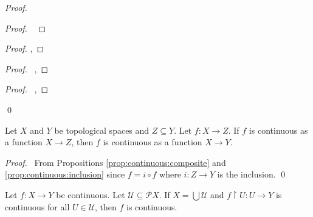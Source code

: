 \begin{proof}
  \pf
  \begin{proof}
    \pf\ 
  \end{proof}
  \begin{proof}
    \pf {}, 
  \end{proof}
  \begin{proof}
    \pf\ , 
  \end{proof}
  \begin{proof}
    \pf\ , 
  \end{proof}
  \qed
\end{proof}

\begin{prop}
  \label{prop:continuous:expand_domain}
  Let $X$ and $Y$ be topological spaces and $Z \subseteq Y$. Let $f : X \rightarrow Z$. If $f$ is continuous as a function $X \rightarrow Z$, then $f$ is continuous as a function $X \rightarrow Y$.
\end{prop}

\begin{proof}
  \pf\ From Propositions \ref{prop:continuous:composite} and \ref{prop:continuous:inclusion} since $f = i \circ f$ where $i : Z \rightarrow Y$ is the inclusion. \qed
\end{proof}

\begin{prop}
  Let $f : X \rightarrow Y$ be continuous. Let $\mathcal{U} \subseteq \mathcal{P} X$. If $X = \bigcup \mathcal{U}$ and $f \restriction U : U \rightarrow Y$ is continuous for all $U \in \mathcal{U}$, then $f$ is continuous.
\end{prop}

